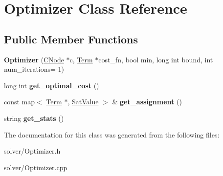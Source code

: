 \hypertarget{classOptimizer}{\section{\-Optimizer \-Class \-Reference}
\label{classOptimizer}
}
\subsection*{\-Public \-Member \-Functions}
\begin{DoxyCompactItemize}
\item 
\hypertarget{classOptimizer_a35ee40c7e5bd5735eb8fc7ea121961a4}{{\bfseries \-Optimizer} (\hyperlink{classCNode}{\-C\-Node} $\ast$c, \hyperlink{classTerm}{\-Term} $\ast$cost\-\_\-fn, bool min, long int bound, int num\-\_\-iterations=-\/1)}\label{classOptimizer_a35ee40c7e5bd5735eb8fc7ea121961a4}

\item 
\hypertarget{classOptimizer_a6125345c0b713278e989ffe2918839d1}{long int {\bfseries get\-\_\-optimal\-\_\-cost} ()}\label{classOptimizer_a6125345c0b713278e989ffe2918839d1}

\item 
\hypertarget{classOptimizer_aa945fcb4b4e2614d82f9d9e1eb64d759}{const map$<$ \hyperlink{classTerm}{\-Term} $\ast$, \hyperlink{classSatValue}{\-Sat\-Value} $>$ \& {\bfseries get\-\_\-assignment} ()}\label{classOptimizer_aa945fcb4b4e2614d82f9d9e1eb64d759}

\item 
\hypertarget{classOptimizer_a986f4b83737d16a76be1943200f750f1}{string {\bfseries get\-\_\-stats} ()}\label{classOptimizer_a986f4b83737d16a76be1943200f750f1}

\end{DoxyCompactItemize}


\-The documentation for this class was generated from the following files\-:\begin{DoxyCompactItemize}
\item 
solver/\-Optimizer.\-h\item 
solver/\-Optimizer.\-cpp\end{DoxyCompactItemize}
